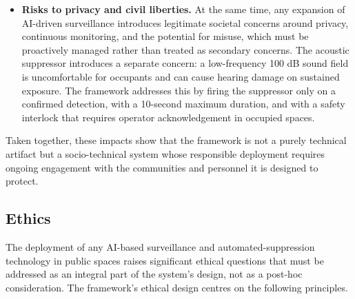 \begin{itemize}
\item \textbf{Risks to privacy and civil liberties.} At the same time, any expansion of AI-driven surveillance introduces legitimate societal concerns around privacy, continuous monitoring, and the potential for misuse, which must be proactively managed rather than treated as secondary concerns. The acoustic suppressor introduces a separate concern: a low-frequency 100 dB sound field is uncomfortable for occupants and can cause hearing damage on sustained exposure. The framework addresses this by firing the suppressor only on a confirmed detection, with a 10-second maximum duration, and with a safety interlock that requires operator acknowledgement in occupied spaces.
\end{itemize}

Taken together, these impacts show that the framework is not a purely technical artifact but a socio-technical system whose responsible deployment requires ongoing engagement with the communities and personnel it is designed to protect.

\subsection{Ethics}

The deployment of any AI-based surveillance and automated-suppression technology in public spaces raises significant ethical questions that must be addressed as an integral part of the system's design, not as a post-hoc consideration. The framework's ethical design centres on the following principles.

